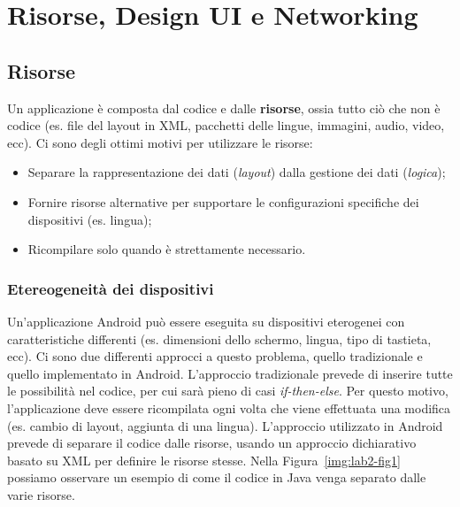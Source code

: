 \newcommand{\myparagraph}[1]{\paragraph{#1}\mbox{}\\}

\chapter{Risorse, Design UI e Networking}

\section{Risorse}

Un applicazione è composta dal codice e dalle \textbf{risorse}, ossia tutto ciò che non è codice (es. file del layout in XML, pacchetti delle lingue, immagini, audio, video, ecc).
Ci sono degli ottimi motivi per utilizzare le risorse:

\begin{itemize}
\item Separare la rappresentazione dei dati (\textit{layout}) dalla gestione dei dati (\textit{logica});
\item Fornire risorse alternative per supportare le configurazioni specifiche dei dispositivi (es. lingua);
\item Ricompilare solo quando è strettamente necessario. 
\end{itemize}

\subsection{Etereogeneità dei dispositivi}

Un'applicazione Android può essere eseguita su dispositivi eterogenei con caratteristiche differenti (es. dimensioni dello schermo, lingua, tipo di tastieta, ecc). Ci sono due differenti approcci a questo problema, quello tradizionale e quello implementato in Android.
L'approccio tradizionale prevede di inserire tutte le possibilità nel codice, per cui sarà pieno di casi \emph{if-then-else}. Per questo motivo, l'applicazione deve essere ricompilata ogni volta che viene effettuata una modifica (es. cambio di layout, aggiunta di una lingua).
L'approccio utilizzato in Android prevede di separare il codice dalle risorse, usando un approccio dichiarativo basato su XML per definire le risorse stesse. Nella Figura~\ref{img:lab2-fig1} possiamo osservare un esempio di come il codice in Java venga separato dalle varie risorse.

